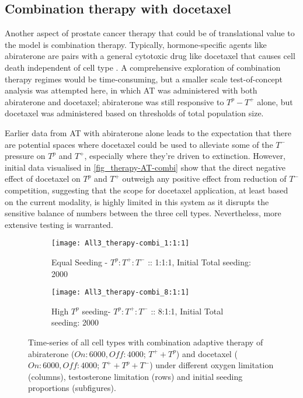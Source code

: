 \clearpage

\subsection{Combination therapy with docetaxel}
Another aspect of prostate cancer therapy that could be of translational value to the model is combination therapy. Typically, hormone-specific agents like abiraterone are pairs with a general cytotoxic drug like docetaxel that causes cell death independent of cell type \cite{West}. A comprehensive exploration of combination therapy regimes would be time-consuming, but a smaller scale test-of-concept analysis was attempted here, in which AT was administered with both abiraterone and docetaxel; abiraterone was still responsive to $T^p - T^+$ alone, but docetaxel was administered based on thresholds of total population size.

Earlier data from AT with abiraterone alone leads to the expectation that there are potential spaces where docetaxel could be used to alleviate some of the $T^-$ pressure on $T^p$ and $T^+$, especially where they’re driven to extinction. However, initial data visualised in \autoref{fig_therapy-AT-combi} show that the direct negative effect of docetaxel on $T^p$ and $T^+$ outweigh any positive effect from reduction of $T^-$ competition, suggesting that the scope for docetaxel application, at least based on the current modality, is highly limited in this system as it disrupts the sensitive balance of numbers between the three cell types. Nevertheless, more extensive testing is warranted.

\begin{figure}[h!]
  \centering
  \begin{subfigure}[b]{\textwidth}
    \centering
    \texttt{[image: All3\_therapy-combi\_1:1:1]}
    \caption{Equal Seeding - $T^p:T^+:T^-$ :: 1:1:1, Initial Total seeding: 2000}
    \label{fig_therapy-AT-combi_1:1:1-2000}
  \end{subfigure}
  \begin{subfigure}[b]{\textwidth}
    \centering
    \texttt{[image: All3\_therapy-combi\_8:1:1]}
    \caption{High $T^p$ seeding- $T^p:T^+:T^-$ :: 8:1:1, Initial Total seeding: 2000}
    \label{fig_therapy-AT_combi_8:1:1-2000}
  \end{subfigure}
  \caption[Time-series of all cell types with combination adaptive therapy]{Time-series of all cell types with combination adaptive therapy of abiraterone ($On:6000, Off:4000$; $T^+ + T^p$) and docetaxel ($On:6000, Off:4000$; $T^+ + T^p + T^-$) under different oxygen limitation (columns), testosterone limitation (rows) and initial seeding proportions (subfigures).}
  \label{fig_therapy-AT-combi}
\end{figure}
